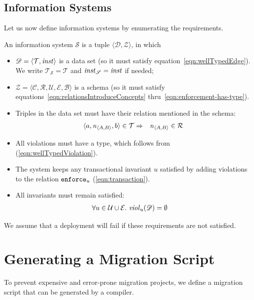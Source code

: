 \documentclass[runningheads]{llncs}
\newcommand{\id}[1]{\text{\it #1\/}}
\newcommand{\enforceC}[1]{{\tt enforce}_{#1}}
\newcommand{\instance}{\mathbin{\id{inst}}}
\newcommand{\viol}[2]{\violC{#1}(#2)}
\newcommand{\violC}[1]{\id{viol}_{#1}}
\newcommand{\declare}[3]{\id{#1}_{\pair{#2}{#3}}}
\newcommand{\pair}[2]{\langle{#1},{#2}\rangle}
\newcommand{\triple}[3]{\langle{#1},{#2},{#3}\rangle}
\newcommand{\quintuple}[5]{\langle{#1},{#2},{#3},{#4},{#5}\rangle}
\newcommand{\concepts}{\mathcal{C}}
\newcommand{\rels}{\mathcal{R}}   %
\newcommand{\triples}{\mathcal{T}}
\newcommand{\rules}{\mathcal{U}}
\newcommand{\transactions}{\mathcal{E}}
\newcommand{\busConstraints}{\mathcal{B}}
\newcommand{\dataset}{\mathscr{D}}
\newcommand{\schema}{\mathscr{Z}}
\newcommand{\infsys}{\mathscr{S}}
\begin{document}
\subsection{Information Systems}
\label{sct:Information Systems}
   Let us now define information systems by enumerating the requirements.
\begin{definition}
\label{def:information system}
\item An information system $\infsys$ is a tuple $\pair{\dataset}{\schema}$, in which
\begin{itemize}
\item $\dataset=\pair{\triples}{\instance}$ is a data set (so it must satisfy equation~\ref{eqn:wellTypedEdge}).
   We write $\triples_\infsys = \triples$ and $\instance_\infsys = \instance$ if needed;
\item $\schema=\quintuple{\concepts}{\rels}{\rules}{\transactions}{\busConstraints}$ is a schema (so it must satisfy equations~\ref{eqn:relationsIntroduceConcepts} thru~\ref{eqn:enforcement-has-type}).
\item Triples in the data set must have their relation mentioned in the schema:
   \begin{eqnarray}
      \triple{a}{\declare{n}{A}{B}}{b}\in\triples&\Rightarrow&\declare{n}{A}{B}\in\rels
   \label{eqn:define R}
   \end{eqnarray}
\item All violations must have a type, which follows from  (\ref{eqn:wellTypedViolation}).
\item The system keeps any transactional invariant $u$ satisfied by adding violations to the relation $\enforceC{u}$ (\ref{eqn:transaction}).
\item All invariants must remain satisfied:
   \begin{align}
      \forall u\in\rules\cup\transactions&.~\viol{u}{\dataset}=\emptyset
   \label{eqn:satisfaction}
   \end{align}
\end{itemize}
\end{definition}
   We assume that a deployment will fail if these requirements are not satisfied.

\section{Generating a Migration Script}
\label{sct:Generating}
   To prevent expensive and error-prone migration projects,
   we define a migration script that can be generated by a compiler.
\end{document}
